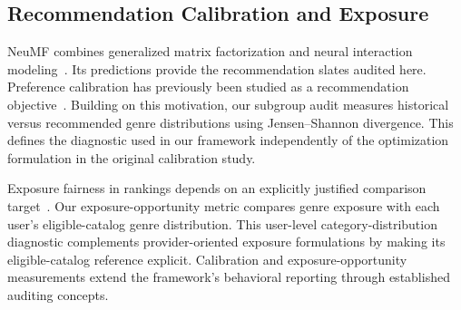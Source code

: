 \subsection{Recommendation Calibration and Exposure}
NeuMF combines generalized matrix factorization and neural interaction modeling~\cite{he2017ncf}. Its predictions provide the recommendation slates audited here. Preference calibration has previously been studied as a recommendation objective~\cite{steck2018calibration}. Building on this motivation, our subgroup audit measures historical versus recommended genre distributions using Jensen--Shannon divergence. This defines the diagnostic used in our framework independently of the optimization formulation in the original calibration study.

Exposure fairness in rankings depends on an explicitly justified comparison target~\cite{singh2018fairness}. Our exposure-opportunity metric compares genre exposure with each user's eligible-catalog genre distribution. This user-level category-distribution diagnostic complements provider-oriented exposure formulations by making its eligible-catalog reference explicit. Calibration and exposure-opportunity measurements extend the framework's behavioral reporting through established auditing concepts.
